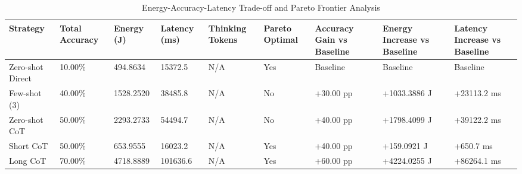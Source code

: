 \begin{table}
\caption{Energy-Accuracy-Latency Trade-off and Pareto Frontier Analysis}
\label{tab:tradeoff_comparison}
\begin{tabular}{lllllllll}
\toprule
Strategy & Total Accuracy & Energy (J) & Latency (ms) & Thinking Tokens & Pareto Optimal & Accuracy Gain vs Baseline & Energy Increase vs Baseline & Latency Increase vs Baseline \\
\midrule
Zero-shot Direct & 10.00\% & 494.8634 & 15372.5 & N/A & Yes & Baseline & Baseline & Baseline \\
Few-shot (3) & 40.00\% & 1528.2520 & 38485.8 & N/A & No & +30.00 pp & +1033.3886 J & +23113.2 ms \\
Zero-shot CoT & 50.00\% & 2293.2733 & 54494.7 & N/A & No & +40.00 pp & +1798.4099 J & +39122.2 ms \\
Short CoT & 50.00\% & 653.9555 & 16023.2 & N/A & Yes & +40.00 pp & +159.0921 J & +650.7 ms \\
Long CoT & 70.00\% & 4718.8889 & 101636.6 & N/A & Yes & +60.00 pp & +4224.0255 J & +86264.1 ms \\
\bottomrule
\end{tabular}
\end{table}
